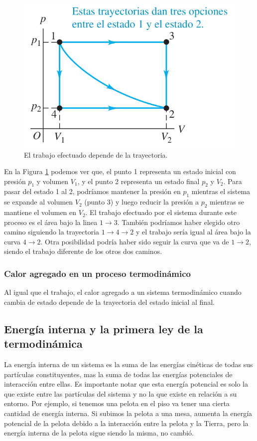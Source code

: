 \documentclass[12pt]{article}
\begin{document}
  \begin{figure}[H]
    \centering
    \includegraphics[width=0.5\linewidth]{imagenes/trabajo-trayectoria.png}
    \caption{El trabajo efectuado depende de la trayectoria.}
    \label{fig:trabajo-trayectoria}
  \end{figure}
  
  En la Figura \ref{fig:trabajo-trayectoria} podemos ver que, el punto 1 representa un estado inicial con presión $ p_{1} $ y volumen $ V_{1} $, y el punto 2 representa un estado final $ p_{2} $ y $ V_{2} $. Para pasar del estado 1 al 2, podríamos mantener la presión en $ p_{1} $ mientras el sistema se expande al volumen $ V_{2} $ (punto 3) y luego reducir la presión a $ p_{2} $ mientras se mantiene el volumen en $ V_{2} $. El trabajo efectuado por el sistema durante este proceso es el área bajo la linea $ 1 \to 3 $. También podríamos haber elegido otro camino siguiendo la trayectoria $ 1 \to 4 \to 2 $ y el trabajo sería igual al área bajo la curva $ 4 \to 2 $. Otra posibilidad podría haber sido seguir la curva que va de $ 1 \to 2 $, siendo el trabajo diferente de los otros dos caminos.

  \subsubsection{Calor agregado en un proceso termodinámico}
  Al igual que el trabajo, el calor agregado a un sistema termodinámico cuando cambia de estado depende de la trayectoria del estado inicial al final.

  \subsection{Energía interna y la primera ley de la termodinámica}
  La energía interna de un sistema es la suma de las energías cinéticas de todas sus partículas constituyentes, mas la suma de todas las energías potenciales de interacción entre ellas. Es importante notar que esta energía potencial es solo la que existe entre las partículas del sistema y no la que existe en relación a su entorno. Por ejemplo, si tenemos una pelota en el piso va tener una cierta cantidad de energía interna. Si subimos la pelota a una mesa, aumenta la energía potencial de la pelota debido a la interacción entre la pelota y la Tierra, pero la energía interna de la pelota sigue siendo la misma, no cambió.
\end{document}

